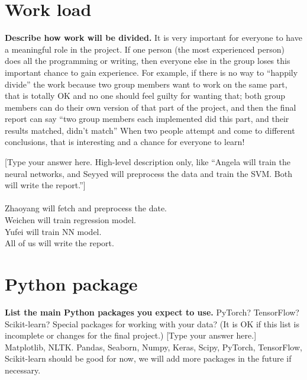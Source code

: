 \documentclass[a4paper,11pt]{article}
\begin{document}
\section{Work load}
\textbf{Describe how work will be divided.} It is very important for everyone to have a meaningful role in the project. If one person (the most experienced person) does all the programming or writing, then everyone else in the group loses this important chance to gain experience. For example, if there is no way to “happily divide” the work because two group members want to work on the same part, that is totally OK and no one should feel guilty for wanting that; both group members can do their own version of that part of the project, and then the final report can say “two group members each implemented did this part, and their results {matched, didn’t match}” When two people attempt and come to different conclusions, that is interesting and a chance for everyone to learn!

[Type your answer here. High-level description only, like “Angela will train the neural networks, and Seyyed will preprocess the data and train the SVM. Both will write the report.”]
\\
\\
Zhaoyang will fetch and preprocess the date.\\
Weichen will train regression model.\\
Yufei will train NN model.\\
All of us will write the report.\\

\newpage

\section{Python package}
\textbf{List the main Python packages you expect to use.} PyTorch? TensorFlow? Scikit-learn? Special packages for working with your data? (It is OK if this list is incomplete or changes for the final project.) 
[Type your answer here.]
\\

Matplotlib, NLTK. Pandas, Seaborn, Numpy, Keras, Scipy, PyTorch, TensorFlow, Scikit-learn should be good for now, we will add more packages in the future if necessary.

\pagebreak


\newpage


\nocite{*}
\end{document}

